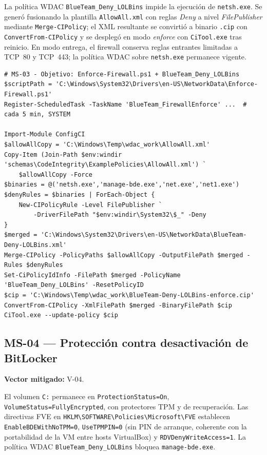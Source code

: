 La política WDAC \texttt{BlueTeam\_}\allowbreak\texttt{Deny\_}\allowbreak\texttt{LOLBins} impide la ejecución de \texttt{netsh.exe}. Se generó fusionando la plantilla \texttt{AllowAll.xml} con reglas \textit{Deny} a nivel \textit{FilePublisher} mediante \texttt{Merge-CIPolicy}; el XML resultante se convirtió a binario \texttt{.cip} con \texttt{ConvertFrom-CIPolicy} y se desplegó en modo \textit{enforce} con \texttt{CiTool.exe} tras reinicio. En modo entrega, el firewall conserva reglas entrantes limitadas a TCP~80 y TCP~443; la política WDAC sobre \texttt{netsh.exe} permanece vigente.

\begin{lstlisting}[caption={MS-03 --- Objetivo: refuerzo de firewall y política WDAC consolidada.}]
# MS-03 - Objetivo: Enforce-Firewall.ps1 + BlueTeam_Deny_LOLBins
$scriptPath = 'C:\Windows\System32\Drivers\en-US\NetworkData\Enforce-Firewall.ps1'
Register-ScheduledTask -TaskName 'BlueTeam_FirewallEnforce' ...  # cada 5 min, SYSTEM

Import-Module ConfigCI
$allowAllCopy = 'C:\Windows\Temp\wdac_work\AllowAll.xml'
Copy-Item (Join-Path $env:windir 'schemas\CodeIntegrity\ExamplePolicies\AllowAll.xml') `
    $allowAllCopy -Force
$binaries = @('netsh.exe','manage-bde.exe','net.exe','net1.exe')
$denyRules = $binaries | ForEach-Object {
    New-CIPolicyRule -Level FilePublisher `
        -DriverFilePath "$env:windir\System32\$_" -Deny
}
$merged = 'C:\Windows\System32\Drivers\en-US\NetworkData\BlueTeam-Deny-LOLBins.xml'
Merge-CIPolicy -PolicyPaths $allowAllCopy -OutputFilePath $merged -Rules $denyRules
Set-CiPolicyIdInfo -FilePath $merged -PolicyName 'BlueTeam_Deny_LOLBins' -ResetPolicyID
$cip = 'C:\Windows\Temp\wdac_work\BlueTeam-Deny-LOLBins-enforce.cip'
ConvertFrom-CIPolicy -XmlFilePath $merged -BinaryFilePath $cip
CiTool.exe --update-policy $cip
\end{lstlisting}

\subsection{MS-04 --- Protección contra desactivación de BitLocker}

\textbf{Vector mitigado:} V-04.

El volumen \texttt{C:} permanece en \texttt{Protection}\allowbreak\texttt{Status=On}, \texttt{Volume}\allowbreak\texttt{Status=FullyEncrypted}, con protectores TPM y de recuperación. Las directivas FVE en \texttt{HKLM\textbackslash}\allowbreak\texttt{SOFTWARE\textbackslash}\allowbreak\texttt{Policies\textbackslash}\allowbreak\texttt{Microsoft\textbackslash}\allowbreak\texttt{FVE} establecen \texttt{EnableBDE}\allowbreak\texttt{WithNoTPM=0}, \texttt{UseTPMPIN=0} (sin PIN de arranque, coherente con la portabilidad de la VM entre hosts VirtualBox) y \texttt{RDVDeny}\allowbreak\texttt{WriteAccess=1}. La política WDAC \texttt{BlueTeam\_}\allowbreak\texttt{Deny\_}\allowbreak\texttt{LOLBins} bloquea \texttt{manage-bde.exe}.


